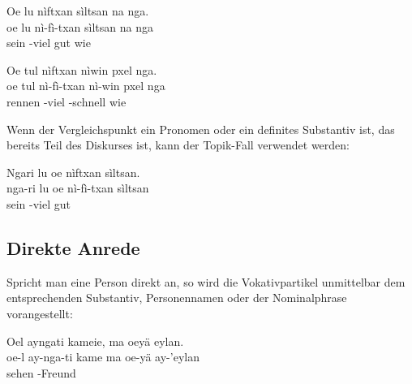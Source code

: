 \begin{interlin}
	\glll \Npawl{}Oe lu nìftxan sìltsan na nga. \\
	oe lu nì-fì-txan sìltsan na nga \\
	 sein -viel gut wie  \\
\end{interlin}

\begin{interlin}
	\glll Oe tul nìftxan nìwin pxel nga. \\
	oe tul nì-fì-txan nì-win pxel nga \\
	 rennen -viel -schnell wie  \\
\end{interlin}

\noindent Wenn der Vergleichspunkt ein Pronomen oder ein definites Substantiv ist, das bereits Teil des Diskurses ist, kann der Topik-Fall verwendet werden: 

\begin{interlin}
	\glll \Npawl{}Ngari lu oe nìftxan sìltsan. \\
	nga-ri lu oe nì-fì-txan sìltsan \\
	 sein  -viel gut \\
\end{interlin}\label{syntax:adj-eql-comp}
 


\subsection{Direkte Anrede}
Spricht man eine Person direkt an, so wird die Vokativpartikel  unmittelbar dem entsprechenden Substantiv, Personennamen oder der Nominalphrase vorangestellt: 

\begin{interlin}
	\glll \Npawl{}Oel ayngati kameie, ma oeyä eylan. \\
	oe-l ay-nga-ti kame ma oe-yä ay-'eylan \\
	  sehen   -Freund \\
\end{interlin}


